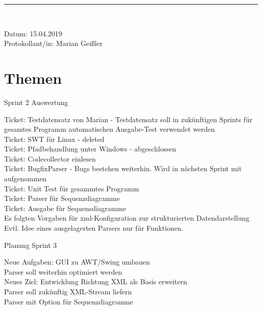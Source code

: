 \begin{center}
\vspace{0.5pt}\nointerlineskip\rule{\textwidth}{0.2pt}\\ 
\vspace{0.5pt}\nointerlineskip
\end{center} 
\large Datum: 15.04.2019\vspace{3pt}\\\large Protokollant/in: Marian Geißler
\section*{Themen}
\begin{LARGE}
Sprint 2 Auswertung\\
\end{LARGE}
Ticket: Testdatensatz von Marian - Testdatensatz soll in zukünftigen Sprints für gesamtes Programm automatischen Ausgabe-Test verwendet werden\\
Ticket: SWT für Linux - deleted\\
Ticket: Pfadbehandlung unter Windows - abgeschlossen\\
Ticket: Codecollector einlesen  \\
Ticket: BugfixParser - Bugs bestehen weiterhin. Wird in nächsten Sprint mit aufgenommen\\
Ticket: Unit Test für gesammtes Programm\\
Ticket: Parser für Sequenzdiagramme\\
Ticket: Ausgabe für Sequensdiagramme\\
Es folgten Vorgaben für xml-Konfiguration zur strukturierten Datendarstellung\\
Evtl. Idee eines ausgelagerten Parsers nur für Funktionen.\\
\begin{LARGE} 
Planung Sprint 3\\
\end{LARGE}
Neue Aufgaben: GUI zu AWT/Swing umbauen\\
Parser soll weiterhin optimiert werden\\
Neues Ziel: Entwicklung Richtung XML als Basis erweitern\\
Parser soll zukünftig XML-Stream liefern\\
Parser mit Option für Sequenzdiagramme\\
